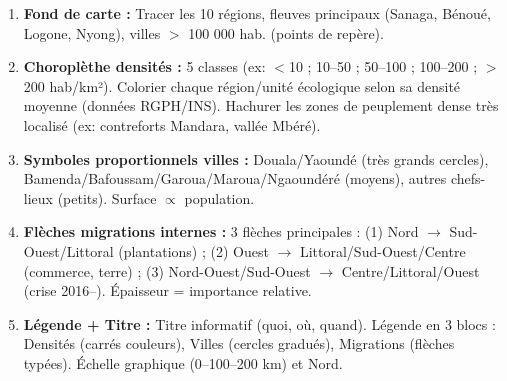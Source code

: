 \documentclass[11pt]{article}
\begin{document}
\begin{methode}
\begin{enumerate}
    \item \textbf{Fond de carte :} Tracer les 10 régions, fleuves principaux (Sanaga, Bénoué, Logone, Nyong), villes $>$ 100 000 hab. (points de repère).
    \item \textbf{Choroplèthe densités :} 5 classes (ex: $<$10 ; 10--50 ; 50--100 ; 100--200 ; $>$200 hab/km²). Colorier chaque région/unité écologique selon sa densité moyenne (données RGPH/INS). Hachurer les zones de peuplement dense très localisé (ex: contreforts Mandara, vallée Mbéré).
    \item \textbf{Symboles proportionnels villes :} Douala/Yaoundé (très grands cercles), Bamenda/Bafoussam/Garoua/Maroua/Ngaoundéré (moyens), autres chefs-lieux (petits). Surface $\propto$ population.
    \item \textbf{Flèches migrations internes :} 3 flèches principales : (1) Nord $\to$ Sud-Ouest/Littoral (plantations) ; (2) Ouest $\to$ Littoral/Sud-Ouest/Centre (commerce, terre) ; (3) Nord-Ouest/Sud-Ouest $\to$ Centre/Littoral/Ouest (crise 2016--). Épaisseur = importance relative.
    \item \textbf{Légende + Titre :} Titre informatif (quoi, où, quand). Légende en 3 blocs : Densités (carrés couleurs), Villes (cercles gradués), Migrations (flèches typées). Échelle graphique (0--100--200 km) et Nord.
\end{enumerate}
\end{methode}
\end{document}
